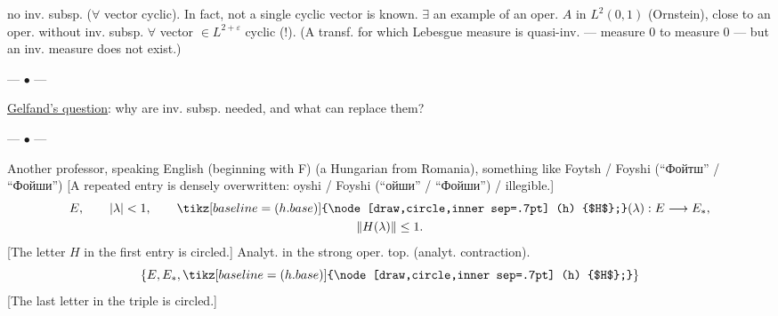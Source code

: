 no inv. subsp. ($\forall$ vector cyclic).
In fact, not a single cyclic vector is known.
$\exists$ an example of an oper. $A$ in $L^2(0,1)$ (Ornstein), close to
an oper. without inv. subsp.
$\forall$ vector $\in L^{2+\varepsilon}$ cyclic (!).
(A transf. for which Lebesgue measure is quasi-inv. — measure $0$ to measure $0$ —
but an inv. measure does not exist.)
\begin{center}— $\bullet$ —\end{center}
\underline{Gelfand's question}: why are inv. subsp. needed, and what can replace them?
\begin{center}— $\bullet$ —\end{center}
Another professor, speaking English (beginning with F)
(a Hungarian from Romania), something like
Foytsh / Foyshi (“Фойтш” / “Фойши”)
[A repeated entry is densely overwritten:
oyshi / Foyshi (“ойши” / “Фойши”) / illegible.]
\begin{gather*}
E,\qquad|\lambda|<1,\qquad \mathord{\tikz[baseline=(h.base)]{\node[draw,circle,inner sep=.7pt] (h) {$H$};}}(\lambda):E\longrightarrow E_*,\\
\|H(\lambda)\|\leq1.
\end{gather*}
[The letter $H$ in the first entry is circled.]
Analyt. in the strong oper. top. (analyt. contraction).
\begin{equation*}
\{E,E_*,\mathord{\tikz[baseline=(h.base)]{\node[draw,circle,inner sep=.7pt] (h) {$H$};}}\}
\end{equation*}
[The last letter in the triple is circled.]

